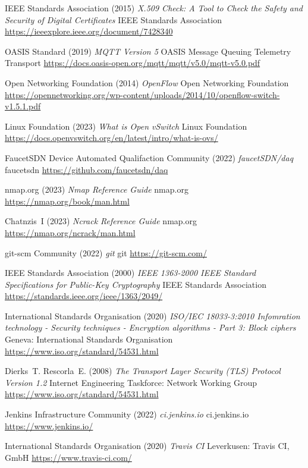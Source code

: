 \documentclass[11pt, oneside]{book}   	%
\begin{document}
\begin{thebibliography}{99}
 IEEE Standards Association (2015)
\emph{X.509 Check: A Tool to Check the Safety and Security of Digital Certificates}
IEEE Standards Association
\url{https://ieeexplore.ieee.org/document/7428340}

 OASIS Standard (2019)
\emph{MQTT Version 5}
OASIS Message Queuing Telemetry Transport 
\url{https://docs.oasis-open.org/mqtt/mqtt/v5.0/mqtt-v5.0.pdf}

 Open Networking Foundation (2014)
\emph{OpenFlow}
Open Networking Foundation
\url{https://opennetworking.org/wp-content/uploads/2014/10/openflow-switch-v1.5.1.pdf}

 Linux Foundation (2023)
\emph{What is Open vSwitch}
Linux Foundation 
\url{https://docs.openvswitch.org/en/latest/intro/what-is-ovs/}

 FaucetSDN Device Automated Qualifaction Community (2022)
\emph{faucetSDN/daq}
faucetsdn
\url{https://github.com/faucetsdn/daq}

 nmap.org (2023)
\emph{Nmap Reference Guide}
nmap.org
\url{https://nmap.org/book/man.html}

 Chatnzis~I (2023)
\emph{Ncrack Reference Guide}
nmap.org
\url{https://nmap.org/ncrack/man.html}

 git-scm Community (2022)
\emph{git}
git
\url{https://git-scm.com/}

 IEEE Standards Association (2000)
\emph{IEEE 1363-2000 IEEE Standard Specifications for Public-Key Cryptography}
IEEE Standards Association
\url{https://standards.ieee.org/ieee/1363/2049/}

 International Standards Organisation (2020)
\emph{ISO/IEC 18033-3:2010 Infomration technology - Security techniques - Encryption algorithms - Part 3: Block ciphers}
Geneva: International Standards Organisation
\url{https://www.iso.org/standard/54531.html}

 Dierks~T. Rescorla~E. (2008)
\emph{The Transport Layer Security (TLS) Protocol Version 1.2}
Internet Engineering Taskforce: Network Working Group
\url{https://www.iso.org/standard/54531.html}

 Jenkins Infrastructure Community (2022)
\emph{ci.jenkins.io}
ci.jenkins.io
\url{https://www.jenkins.io/}

 International Standards Organisation (2020)
\emph{Travis CI}
Leverkusen: Travis CI, GmbH
\url{https://www.travis-ci.com/}



\end{thebibliography}
\end{document}
